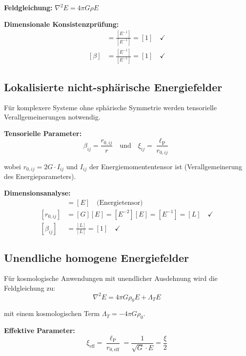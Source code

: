 \documentclass[12pt,a4paper]{report}
\newcommand{\lP}{\ell_{\text{P}}}         %
\newcommand{\Lambdat}{\Lambda_T}          %
\begin{document}
	\textbf{Feldgleichung:} $\nabla^2 E = 4\pi G \rho E$
	
	\textbf{Dimensionale Konsistenzprüfung:}
	\begin{align}
		[\xi] &= \frac{[E^{-1}]}{[E^{-1}]} = [1] \quad \checkmark \\
		[\beta] &= \frac{[E^{-1}]}{[E^{-1}]} = [1] \quad \checkmark
	\end{align}
	
	\subsection{Lokalisierte nicht-sphärische Energiefelder}\label{subsec:localized_non_spherical}
	
	Für komplexere Systeme ohne sphärische Symmetrie werden tensorielle Verallgemeinerungen notwendig.
	
	\textbf{Tensorielle Parameter:}
	\begin{equation}
		\beta_{ij} = \frac{r_{0,ij}}{r} \quad \text{und} \quad 	\xi_{ij} = \frac{\lP}{r_{0,ij}}
		\label{eq:tensorial_parameters}
	\end{equation}
	
	wobei $r_{0,ij} = 2G \cdot I_{ij}$ und $I_{ij}$ der Energiemomententensor ist (Verallgemeinerung des Energieparameters).
	
	\textbf{Dimensionsanalyse:}
	\begin{align}
		[I_{ij}] &= [E] \quad \text{(Energietensor)} \\
		[r_{0,ij}] &= [G][E] = [E^{-2}][E] = [E^{-1}] = [L] \quad \checkmark \\
		[\beta_{ij}] &= \frac{[L]}{[L]} = [1] \quad \checkmark
	\end{align}
	
	\subsection{Unendliche homogene Energiefelder}\label{subsec:infinite_homogeneous}
	
	Für kosmologische Anwendungen mit unendlicher Ausdehnung wird die Feldgleichung zu:
	\begin{equation}
		\nabla^2 E = 4\pi G \rho_0 E + \Lambdat E
		\label{eq:field_equation_cosmological}
	\end{equation}
	
	mit einem kosmologischen Term $\Lambdat = -4\pi G \rho_0$.
	
	\textbf{Effektive Parameter:}
	\begin{equation}
		\xi_{\text{eff}} = \frac{\lP}{r_{0,\text{eff}}} = \frac{1}{\sqrt{G} \cdot E} = \frac{\xi}{2}
		\label{eq:xi_effective}
	\end{equation}
	
\end{document}
